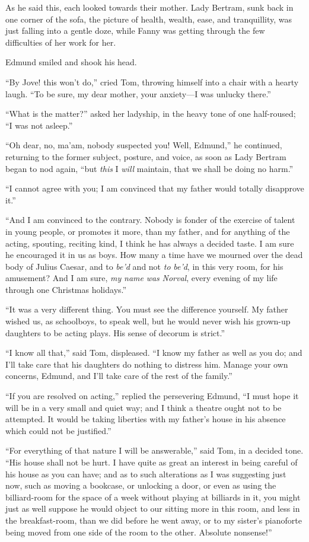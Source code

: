 As he said this, each looked towards their mother.
Lady Bertram, sunk back in one corner of the sofa,
the picture of health, wealth, ease, and tranquillity,
was just falling into a gentle doze, while Fanny was getting
through the few difficulties of her work for her.

Edmund smiled and shook his head.

``By Jove! this won't do,'' cried Tom, throwing himself into
a chair with a hearty laugh.  ``To be sure, my dear mother,
your anxiety---I was unlucky there.''

``What is the matter?'' asked her ladyship, in the heavy
tone of one half-roused; ``I was not asleep.''

``Oh dear, no, ma'am, nobody suspected you!  Well, Edmund,''
he continued, returning to the former subject, posture,
and voice, as soon as Lady Bertram began to nod again,
``but \emph{this} I \emph{will} maintain, that we shall be doing
no harm.''

``I cannot agree with you; I am convinced that my father
would totally disapprove it.''

``And I am convinced to the contrary.  Nobody is fonder of
the exercise of talent in young people, or promotes it more,
than my father, and for anything of the acting, spouting,
reciting kind, I think he has always a decided taste.
I am sure he encouraged it in us as boys.  How many a time
have we mourned over the dead body of Julius Caesar,
and to \emph{be'd} and not \emph{to} \emph{be'd}, in this very room,
for his amusement?  And I am sure, \emph{my} \emph{name} \emph{was} \emph{Norval},
every evening of my life through one Christmas holidays.''

``It was a very different thing.  You must see the
difference yourself.  My father wished us, as schoolboys,
to speak well, but he would never wish his grown-up
daughters to be acting plays.  His sense of decorum is strict.''

``I know all that,'' said Tom, displeased.  ``I know my father
as well as you do; and I'll take care that his daughters
do nothing to distress him.  Manage your own concerns,
Edmund, and I'll take care of the rest of the family.''

``If you are resolved on acting,'' replied the persevering Edmund,
``I must hope it will be in a very small and quiet way;
and I think a theatre ought not to be attempted.
It would be taking liberties with my father's house
in his absence which could not be justified.''

``For everything of that nature I will be answerable,''
said Tom, in a decided tone.  ``His house shall not be hurt.
I have quite as great an interest in being careful
of his house as you can have; and as to such alterations
as I was suggesting just now, such as moving a bookcase,
or unlocking a door, or even as using the billiard-room
for the space of a week without playing at billiards in it,
you might just as well suppose he would object to our sitting
more in this room, and less in the breakfast-room, than
we did before he went away, or to my sister's pianoforte
being moved from one side of the room to the other.
Absolute nonsense!''

